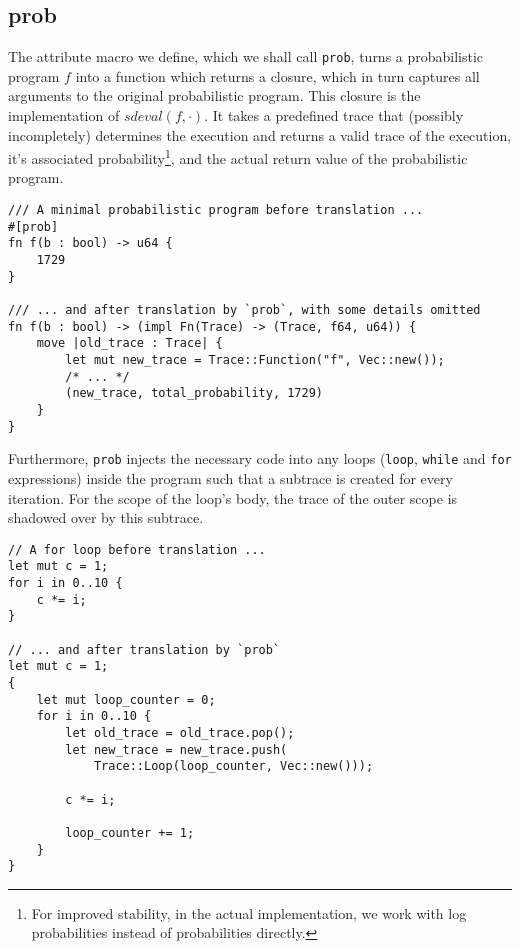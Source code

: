 \subsection{prob}

The attribute macro we define, which we shall call \lstinline{prob}, turns a probabilistic program $f$ into a function which returns a closure, which in turn captures all arguments to the original probabilistic program. This closure is the implementation of $sdeval(f,\cdot)$. It takes a predefined trace that (possibly incompletely) determines the execution and returns a valid trace of the execution, it's associated probability\footnote{For improved stability, in the actual implementation, we work with log probabilities instead of probabilities directly.}, and the actual return value of the probabilistic program.

\begin{minipage}{\linewidth}
\begin{lstlisting}
/// A minimal probabilistic program before translation ...
#[prob]
fn f(b : bool) -> u64 {
    1729
}

/// ... and after translation by `prob`, with some details omitted
fn f(b : bool) -> (impl Fn(Trace) -> (Trace, f64, u64)) {
    move |old_trace : Trace| {
        let mut new_trace = Trace::Function("f", Vec::new());
        /* ... */
        (new_trace, total_probability, 1729)
    }
}
\end{lstlisting}
\end{minipage}

Furthermore, \lstinline{prob} injects the necessary code into any loops (\lstinline{loop}, \lstinline{while} and \lstinline{for} expressions) inside the program such that a subtrace is created for every iteration. For the scope of the loop's body, the trace of the outer scope is shadowed over by this subtrace.

\begin{minipage}{\linewidth}
\begin{lstlisting}
// A for loop before translation ...
let mut c = 1;
for i in 0..10 {
    c *= i;
}

// ... and after translation by `prob`
let mut c = 1;
{
    let mut loop_counter = 0;
    for i in 0..10 {
        let old_trace = old_trace.pop();
        let new_trace = new_trace.push(
            Trace::Loop(loop_counter, Vec::new()));

        c *= i;

        loop_counter += 1;
    }
}
\end{lstlisting}
\end{minipage}

